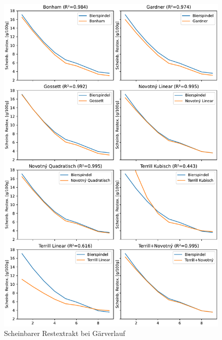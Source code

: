 \documentclass[a4paper,parskip=half]{scrartcl}
\begin{document}
\begin{figure}[H]
\centering
\includegraphics[width=14cm]{graph_fermentation.pdf}
\caption{Scheinbarer Restextrakt bei Gärverlauf}
\label{fig:novotnygraph}
\end{figure}
\end{document}

